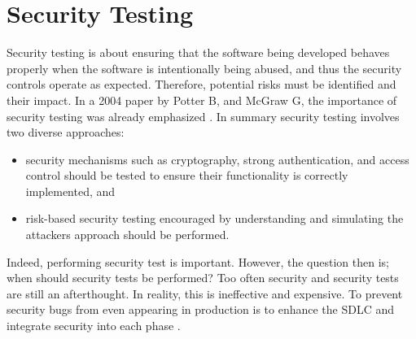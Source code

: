 \section{Security Testing}
Security testing is about ensuring that the software being developed behaves properly when the software is intentionally being abused, and thus the security controls operate as expected. Therefore, potential risks must be identified and their impact. In a 2004 paper by Potter B, and McGraw G, the importance of security testing was already emphasized \cite{Potter_2004}. In summary security testing involves two diverse approaches:

\begin{itemize}
    \item security mechanisms such as cryptography, strong authentication, and access control should be tested to ensure their functionality is correctly implemented, and
    \item risk-based security testing encouraged by understanding and simulating the attackers approach should be performed.
\end{itemize}

Indeed, performing security test is important. However, the question then is; when should security tests be performed? Too often security and security tests are still an afterthought. In reality, this is ineffective and expensive. To prevent security bugs from even appearing in production is to enhance the SDLC and integrate security into each phase \cite{owasp_testing_guide}. 

